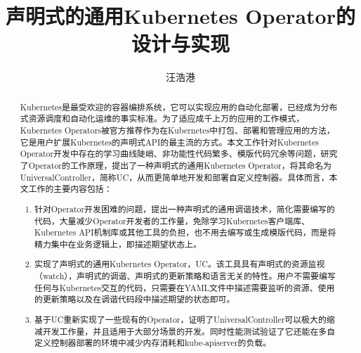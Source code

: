 \documentclass[macfonts,master]{njuthesis}
\title{声明式的通用Kubernetes Operator的设计与实现}
\author{汪浩港}
\institute{南京大学}
\begin{document}

\maketitle
\makeenglishtitle


\frontmatter

\begin{abstract}
Kubernetes是最受欢迎的容器编排系统，它可以实现应用的自动化部署，已经成为分布式资源调度和自动化运维的事实标准。为了适应成千上万的应用的工作模式，Kubernetes Operators被官方推荐作为在Kubernetes中打包、部署和管理应用的方法，它是用户扩展Kubernetes的声明式API的最主流的方式。本文工作针对Kubernetes Operator开发中存在的学习曲线陡峭、非功能性代码繁多、模版代码冗余等问题，研究了Operator的工作原理，提出了一种声明式的通用Kubernetes Operator，将其命名为UniversalController，简称UC，从而更简单地开发和部署自定义控制器。具体而言，本文工作的主要内容包括：
\begin{enumerate}
	\item 针对Operator开发困难的问题，提出一种声明式的通用调谐技术，简化需要编写的代码，大量减少Operator开发者的工作量，免除学习Kubernetes客户端库、Kubernetes API机制库或其他工具的负担，也不用去编写或生成模版代码，而是将精力集中在业务逻辑上，即描述期望状态上。
	\item 实现了声明式的通用Kubernetes Operator，UC。该工具具有声明式的资源监视（watch），声明式的调谐、声明式的更新策略和语言无关的特性。用户不需要编写任何与Kubernetes交互的代码，只需要在YAML文件中描述需要监听的资源、使用的更新策略以及在调谐代码段中描述期望的状态即可。
	\item 基于UC重新实现了一些现有的Operator，证明了UniversalController可以极大的缩减开发工作量，并且适用于大部分场景的开发。同时性能测试验证了它还能在多自定义控制器部署的环境中减少内存消耗和kube-apiserver的负载。
\end{enumerate}

\end{abstract}
\end{document}
